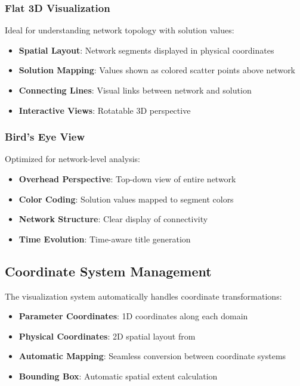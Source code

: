 \subsubsection{Flat 3D Visualization}
Ideal for understanding network topology with solution values:
\begin{itemize}
    \item \textbf{Spatial Layout}: Network segments displayed in physical coordinates
    \item \textbf{Solution Mapping}: Values shown as colored scatter points above network
    \item \textbf{Connecting Lines}: Visual links between network and solution
    \item \textbf{Interactive Views}: Rotatable 3D perspective
\end{itemize}

\subsubsection{Bird's Eye View}
Optimized for network-level analysis:
\begin{itemize}
    \item \textbf{Overhead Perspective}: Top-down view of entire network
    \item \textbf{Color Coding}: Solution values mapped to segment colors
    \item \textbf{Network Structure}: Clear display of connectivity
    \item \textbf{Time Evolution}: Time-aware title generation
\end{itemize}

\subsection{Coordinate System Management}

The visualization system automatically handles coordinate transformations:
\begin{itemize}
    \item \textbf{Parameter Coordinates}: 1D coordinates along each domain
    \item \textbf{Physical Coordinates}: 2D spatial layout from 
    \item \textbf{Automatic Mapping}: Seamless conversion between coordinate systems
    \item \textbf{Bounding Box}: Automatic spatial extent calculation
\end{itemize}

